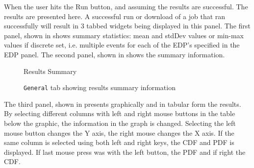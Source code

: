 When the user hits the Run button, and assuming the results are
successful. The results are presented here.  A successful run or
download of a job that ran successfully will result in 3 tabbed
widgets being displayed in this panel.  The first panel, shown in
 shows summary statistics: mean and
stdDev values or min-max values if discrete set, i.e. multiple events
for each of the EDP's specified in the EDP panel. The second panel,
shown in  shows the summary
information.

\begin{figure}[!htbp]
  \caption{Results Summary}
  \label{fig:results_summary}
\end{figure}

\begin{figure}[!htbp]
  \caption{\texttt{General} tab showing results summary information}
  \label{fig:summary_information}
\end{figure}

The third panel, shown in  presents
graphically and in tabular form the results. By selecting different
columns with left and right mouse buttons in the table below the
graphic, the information in the graph is changed. Selecting the left
mouse button changes the Y axis, the right mouse changes the X
axis. If the same column is selected using both left and right keys,
the CDF and PDF is displayed. If last mouse press was with the left
button, the PDF and if right the CDF.
 
